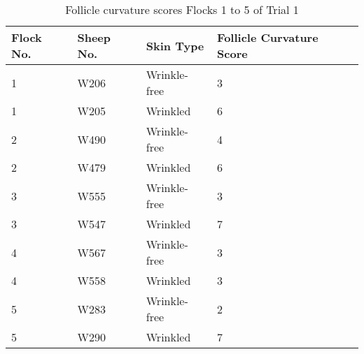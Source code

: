 %

\begin{table}[htp]
\centering
\caption{Follicle curvature  scores Flocks 1 to 5 of Trial 1}
\label{tab:curv}
\vspace{0.1in}
\begin{tabular}{|p{0.6in}|p{0.6in}|p{0.8in}|p{0.8in}|}  \hline
     Flock No. & Sheep No.  &  Skin Type & Follicle Curvature Score  \\ 
\hline
  1 & W206 & Wrinkle-free & 3  \\
  1 & W205 & Wrinkled     & 6  \\
  2 & W490 & Wrinkle-free & 4  \\
  2 & W479 & Wrinkled     & 6  \\
  3 & W555 & Wrinkle-free & 3  \\
  3 & W547 & Wrinkled     & 7  \\
  4 & W567 & Wrinkle-free & 3  \\
  4 & W558 & Wrinkled     & 3  \\
  5 & W283 & Wrinkle-free & 2  \\
  5 & W290 & Wrinkled     & 7  \\ \hline
\end{tabular}
\end{table}

%
